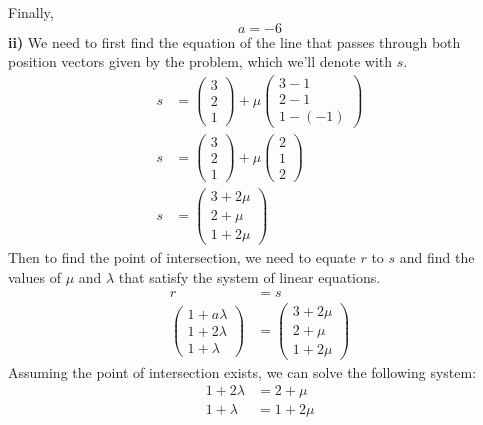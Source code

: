\documentclass[hidelinks, a4paper, 12pt]{article}
\newcommand{\bd}{\textbf}
\begin{document}
            Finally,
            \[a = -6\]
            \bd{ii) }We need to first find the equation of the line that passes through both position vectors given by the problem, which we'll denote with $s$.
            \[\begin{split}
                s &= \begin{pmatrix} 3 \\ 2 \\ 1 \end{pmatrix} + \mu \begin{pmatrix} 3 - 1 \\ 2 - 1 \\ 1 - (-1) \end{pmatrix}\\
                s &= \begin{pmatrix} 3 \\ 2 \\ 1 \end{pmatrix} + \mu \begin{pmatrix} 2 \\ 1 \\ 2 \end{pmatrix}\\
                s &= \begin{pmatrix} 3 + 2\mu \\ 2 + \mu \\ 1 + 2\mu \end{pmatrix}
            \end{split}\]
            Then to find the point of intersection, we need to equate $r$ to $s$ and find the values of $\mu$ and $\lambda$ that satisfy the system of linear equations.
            \[\begin{split}
                r &=s\\
                \begin{pmatrix} 1 + a\lambda \\ 1 + 2\lambda \\ 1 + \lambda \end{pmatrix} &= \begin{pmatrix} 3 + 2\mu \\ 2 + \mu \\ 1 + 2\mu \end{pmatrix}
            \end{split}\]
            Assuming the point of intersection exists, we can solve the following system:
            \begin{equation}
                \begin{split}
                    1 + 2\lambda &= 2 + \mu\\
                    1 + \lambda &= 1 + 2\mu
                \end{split}
            \end{equation}
\end{document}
